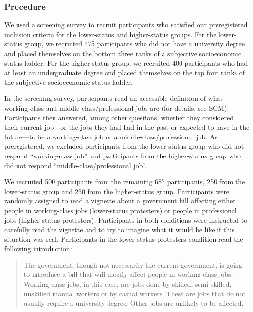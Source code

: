 \documentclass[twocolumn, 11pt, letterpaper]{article}
\begin{document}
\hypertarget{procedure}{%
\subsubsection{Procedure}\label{procedure}}

We used a screening survey to recruit participants who satisfied our
preregistered inclusion criteria for the lower-status and higher-status
groups. For the lower-status group, we recruited 475 participants who
did not have a university degree and placed themselves on the bottom
three ranks of a subjective socioeconomic status ladder. For the
higher-status group, we recruited 400 participants who had at least an
undergraduate degree and placed themselves on the top four ranks of the
subjective socioeconomic status ladder.

In the screening survey, participants read an accessible definition of
what working-class and middle-class/professional jobs are (for details,
see SOM). Participants then answered, among other questions, whether
they considered their current job---or the jobs they had had in the past
or expected to have in the future---to be a working-class job or a
middle-class/professional job. As preregistered, we excluded
participants from the lower-status group who did not respond
``working-class job'' and participants from the higher-status group who
did not respond ``middle-class/professional job''.

We recruited 500 participants from the remaining 687 participants, 250
from the lower-status group and 250 from the higher-status group.
Participants were randomly assigned to read a vignette about a
government bill affecting either people in working-class jobs
(lower-status protesters) or people in professional jobs (higher-status
protesters). Participants in both conditions were instructed to
carefully read the vignette and to try to imagine what it would be like
if this situation was real. Participants in the lower-status protesters
condition read the following introduction:

\begin{quote}
The government, though not necessarily the current government, is going
to introduce a bill that will mostly affect people in working-class
jobs. Working-class jobs, in this case, are jobs done by skilled,
semi-skilled, unskilled manual workers or by casual workers. These are
jobs that do not usually require a university degree. Other jobs are
unlikely to be affected.
\end{quote}
\end{document}
